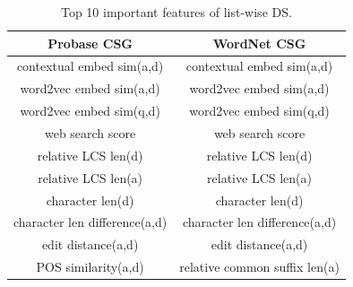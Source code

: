 \begin{table}[t]
			\centering
		\small
		\addtolength{\tabcolsep}{-2pt}
		\begin{tabular}{c|c}
		\toprule
		Probase CSG & WordNet CSG \\

			\midrule
		contextual embed sim(a,d) & contextual embed sim(a,d) \\
		 word2vec embed sim(a,d)   & word2vec embed sim(a,d)  \\
		  word2vec embed sim(q,d)& word2vec embed sim(q,d)  \\
		  web search score & web search score \\
		  relative LCS len(d)   & relative LCS len(d)  \\
		  relative LCS len(a)  & relative LCS len(a)  \\
		  character len(d)   & character len(d)  \\
		  character len difference(a,d)   & character len difference(a,d)  \\
		  edit distance(a,d)   & edit distance(a,d)  \\
		  POS similarity(a,d)   &  relative common suffix len(a) \\
		\bottomrule
	\end{tabular}
	\caption{Top 10 important features of list-wise DS.}
	\label{table:feat_importance}
\end{table}
